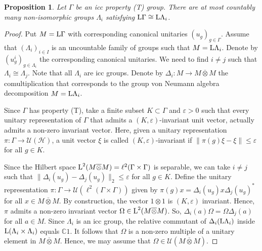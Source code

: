 \documentclass[a4paper,11pt]{amsart}
\numberwithin{equation}{section}
\newtheorem{proposition}[definition]{Proposition}
\begin{document}
\begin{proposition}\label{prop.Connes-up-to-countable}
Let $\Gamma$ be an icc property (T) group. There are at most countably many non-isomorphic groups $\Lambda_i$ satisfying ${\mathord{\text{\rm L}}} \Gamma \cong {\mathord{\text{\rm L}}} \Lambda_i$.
\end{proposition}
\begin{proof}
Put $M = {\mathord{\text{\rm L}}} \Gamma$ with corresponding canonical unitaries $(u_g)_{g \in \Gamma}$. Assume that $(\Lambda_i)_{i \in I}$ is an uncountable family of groups such that $M = {\mathord{\text{\rm L}}} \Lambda_i$. Denote by $(u^i_g)_{g \in \Lambda_i}$ the corresponding canonical unitaries. We need to find $i \neq j$ such that $\Lambda_i \cong \Lambda_j$. Note that all $\Lambda_i$ are icc groups. Denote by ${\Delta}_i : M {\rightarrow} M {\mathbin{\overline{\otimes}}} M$ the comultiplication that corresponds to the group von Neumann algebra decomposition $M = {\mathord{\text{\rm L}}} \Lambda_i$.

Since $\Gamma$ has property (T), take a finite subset $K \subset \Gamma$ and ${\varepsilon} > 0$ such that every unitary representation of $\Gamma$ that admits a $(K,{\varepsilon})$-invariant unit vector, actually admits a non-zero invariant vector. Here, given a unitary representation $\pi : \Gamma {\rightarrow} {\mathcal{U}}({\mathcal{H}})$, a unit vector $\xi$ is called $(K,{\varepsilon})$-invariant if $\|\pi(g)\xi - \xi\|{\leqslant} {\varepsilon}$ for all $g \in K$.

Since the Hilbert space ${\mathord{\text{\rm L}}}^2(M {\mathbin{\overline{\otimes}}} M) = \ell^2(\Gamma \times \Gamma)$ is separable, we can take $i \neq j$ such that $\|{\Delta}_i(u_g) - {\Delta}_j(u_g)\|_2 {\leqslant} {\varepsilon}$ for all $g \in K$. Define the unitary representation $\pi : \Gamma {\rightarrow} {\mathcal{U}}(\ell^2(\Gamma \times \Gamma))$ given by $\pi(g) x = {\Delta}_i(u_g) x {\Delta}_j(u_g)^*$ for all $x \in M {\mathbin{\overline{\otimes}}} M$. By construction, the vector $1 {\otimes} 1$ is $(K,{\varepsilon})$ invariant. Hence, $\pi$ admits a non-zero invariant vector $\Omega \in {\mathord{\text{\rm L}}}^2(M {\mathbin{\overline{\otimes}}} M)$. So, ${\Delta}_i(a) \Omega = \Omega {\Delta}_j(a)$ for all $a \in M$. Since $\Lambda_i$ is an icc group, the relative commutant of ${\Delta}_i({\mathord{\text{\rm L}}} \Lambda_i)$ inside ${\mathord{\text{\rm L}}}(\Lambda_i \times \Lambda_i)$ equals ${\mathbb{C}} 1$. It follows that $\Omega$ is a non-zero multiple of a unitary element in $M {\mathbin{\overline{\otimes}}} M$. Hence, we may assume that $\Omega \in {\mathcal{U}}(M {\mathbin{\overline{\otimes}}} M)$.


\end{proof}
\end{document}
